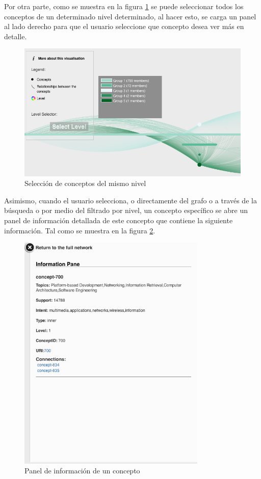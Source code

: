 \documentclass[12pt,oneside,letterpaper]{book}
\theoremstyle{definition}
\begin{document}
Por otra parte, como se muestra en la figura \ref{fig:results_3} se puede seleccionar todos los conceptos de un determinado nivel determinado, al hacer esto, se carga un panel al lado derecho para que el usuario seleccione que concepto desea ver más en detalle.

\begin{figure}[h!]
	\centering
	\includegraphics[width=1\textwidth]{images/results_3.png}
	\caption{Selección de conceptos del mismo nivel}
	\label{fig:results_3}
\end{figure}

Asimismo, cuando el usuario selecciona, o directamente del grafo o a través de la búsqueda o por medio del filtrado por nivel, un concepto específico se abre un panel de información detallada de este concepto que contiene la siguiente información. Tal como se muestra en la figura \ref{fig:results_4}.

 \begin{figure}[h!]
	\centering
	\includegraphics[width=0.8\textwidth]{images/results_4.png}
	\caption{Panel de información de un concepto}
	\label{fig:results_4}
\end{figure}
\end{document}
